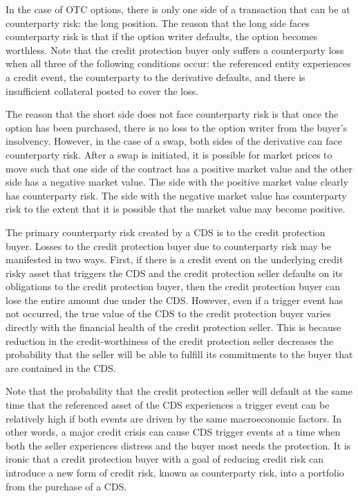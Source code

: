 \documentclass[11pt]{article}
\begin{document}
In the case of OTC options, there is only one side of a transaction that can be at counterparty risk: the long position. The reason that the long side faces counterparty risk is that if the option writer defaults, the option becomes worthless. Note that the credit protection buyer only suffers a counterparty loss when all three of the following conditions occur: the referenced entity experiences a credit event, the counterparty to the derivative defaults, and there is insufficient collateral posted to cover the loss.

The reason that the short side does not face counterparty risk is that once the option has been purchased, there is no loss to the option writer from the buyer's insolvency. However, in the case of a swap, both sides of the derivative can face counterparty risk. After a swap is initiated, it is possible for market prices to move such that one side of the contract has a positive market value and the other side has a negative market value. The side with the positive market value clearly has counterparty risk. The side with the negative market value has counterparty risk to the extent that it is possible that the market value may become positive.

The primary counterparty risk created by a CDS is to the credit protection buyer. Losses to the credit protection buyer due to counterparty risk may be manifested in two ways. First, if there is a credit event on the underlying credit risky asset that triggers the CDS and the credit protection seller defaults on its obligations to the credit protection buyer, then the credit protection buyer can lose the entire amount due under the CDS. However, even if a trigger event has not occurred, the true value of the CDS to the credit protection buyer varies directly with the financial health of the credit protection seller. This is because reduction in the credit-worthiness of the credit protection seller decreases the probability that the seller will be able to fulfill its commitments to the buyer that are contained in the CDS.

Note that the probability that the credit protection seller will default at the same time that the referenced asset of the CDS experiences a trigger event can be relatively high if both events are driven by the same macroeconomic factors. In other words, a major credit crisis can cause CDS trigger events at a time when both the seller experiences distress and the buyer most needs the protection. It is ironic that a credit protection buyer with a goal of reducing credit risk can introduce a new form of credit risk, known as counterparty risk, into a portfolio from the purchase of a CDS.
\end{document}
